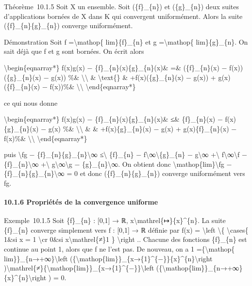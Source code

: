 \documentclass[]{article}
\begin{document}
Théorème~10.1.5 Soit X un ensemble. Soit (\{f\}\_\{n\}) et
(\{g\}\_\{n\}) deux suites d'applications bornées de X dans K qui
convergent uniformément. Alors la suite (\{f\}\_\{n\}\{g\}\_\{n\})
converge uniformément.

Démonstration Soit f =\textbackslash{}mathop\{ lim\}\{f\}\_\{n\} et g
=\textbackslash{}mathop\{ lim\}\{g\}\_\{n\}. On sait déjà que f et g
sont bornées. On écrit alors

\textbackslash{}begin\{eqnarray*\} f(x)g(x) −
\{f\}\_\{n\}(x)\{g\}\_\{n\}(x)\& =\& (\{f\}\_\{n\}(x) −
f(x))(\{g\}\_\{n\}(x) − g(x)) \%\& \textbackslash{}\textbackslash{} \&
\textbackslash{}text\{\} \& +f(x)(\{g\}\_\{n\}(x) − g(x)) +
g(x)(\{f\}\_\{n\}(x) − f(x))\%\& \textbackslash{}\textbackslash{}
\textbackslash{}end\{eqnarray*\}

ce qui nous donne

\textbackslash{}begin\{eqnarray*\} \textbar{}f(x)g(x) −
\{f\}\_\{n\}(x)\{g\}\_\{n\}(x)\textbar{}\& ≤\& \textbar{}\{f\}\_\{n\}(x)
− f(x)\textbar{}\textbar{}\{g\}\_\{n\}(x) − g(x)\textbar{} \%\&
\textbackslash{}\textbackslash{} \& \&
+\textbar{}f(x)\textbar{}\textbar{}\{g\}\_\{n\}(x) − g(x)\textbar{} +
\textbar{}g(x)\textbar{}\textbar{}\{f\}\_\{n\}(x) − f(x)\textbar{}\%\&
\textbackslash{}\textbackslash{} \textbackslash{}end\{eqnarray*\}

puis \textbackslash{}\textbar{}fg −
\{f\}\_\{n\}\{g\}\_\{n\}\textbackslash{}\textbar{}∞
≤\textbackslash{}\textbar{} \{f\}\_\{n\} −
f\textbackslash{}\textbar{}∞\textbackslash{}\textbar{}\{g\}\_\{n\} −
g\textbackslash{}\textbar{}∞ +\textbackslash{}\textbar{}
f\textbackslash{}\textbar{}∞\textbackslash{}\textbar{}f −
\{f\}\_\{n\}\textbackslash{}\textbar{}∞ +\textbackslash{}\textbar{}
g\textbackslash{}\textbar{}∞\textbackslash{}\textbar{}g −
\{g\}\_\{n\}\textbackslash{}\textbar{}∞. On obtient donc
\textbackslash{}mathop\{lim\}\textbackslash{}\textbar{}fg −
\{f\}\_\{n\}\{g\}\_\{n\}\textbackslash{}\textbar{}∞ = 0 et donc
(\{f\}\_\{n\}\{g\}\_\{n\}) converge uniformément vers fg.

\paragraph{10.1.6 Propriétés de la convergence uniforme}

Exemple~10.1.5 Soit \{f\}\_\{n\} : {[}0,1{]} → ℝ,
x\textbackslash{}mathrel\{↦\}\{x\}\^{}\{n\}. La suite \{f\}\_\{n\}
converge simplement vers f : {[}0,1{]} → ℝ définie par f(x) =
\textbackslash{}left \textbackslash{}\{ \textbackslash{}cases\{ 1\&si x
= 1 \textbackslash{}cr 0\&si x\textbackslash{}mathrel\{≠\}1 \}
\textbackslash{}right .. Chacune des fonctions \{f\}\_\{n\} est continue
au point 1, alors que f ne l'est pas. De nouveau, on a 1
=\{\textbackslash{}mathop\{ lim\}\}\_\{n→+∞\}\textbackslash{}left
(\{\textbackslash{}mathop\{lim\}\}\_\{x→\{1\}\^{}\{−\}\}\{x\}\^{}\{n\}\textbackslash{}right
)\textbackslash{}mathrel\{≠\}\{\textbackslash{}mathop\{lim\}\}\_\{x→\{1\}\^{}\{−\}\}\textbackslash{}left
(\{\textbackslash{}mathop\{lim\}\}\_\{n→+∞\}\{x\}\^{}\{n\}\textbackslash{}right
) = 0.
\end{document}
